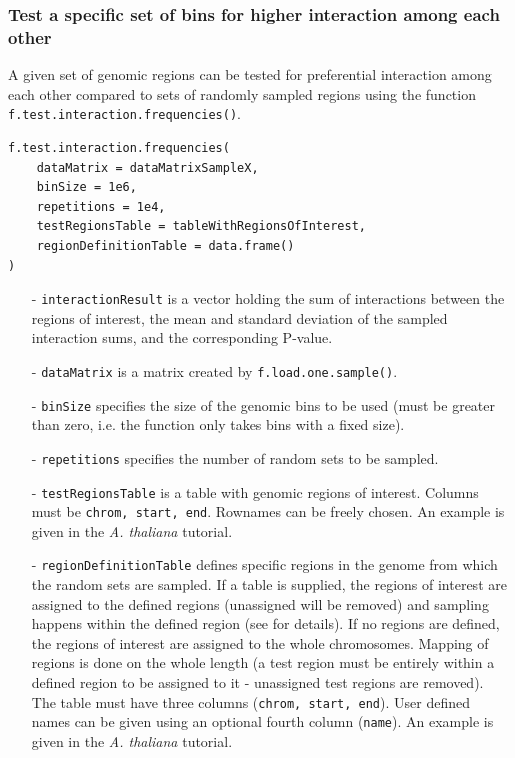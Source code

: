 \documentclass[a4paper,10pt]{article}
\begin{document}
\subsubsection{Test a specific set of bins for higher interaction among each other}
A given set of genomic regions can be tested for preferential interaction among each other compared to sets of randomly sampled regions using the function \texttt{f.test.interaction.frequencies()}.
\begin{verbatim}
f.test.interaction.frequencies(
    dataMatrix = dataMatrixSampleX,
    binSize = 1e6,
    repetitions = 1e4,
    testRegionsTable = tableWithRegionsOfInterest,
    regionDefinitionTable = data.frame()
)
\end{verbatim}
\begin{itemize}
 \item[-] \texttt{interactionResult} is a vector holding the sum of interactions between the regions of interest, the mean and standard deviation of the sampled interaction sums, and the corresponding P-value.
 \item[-] \texttt{dataMatrix} is a matrix created by \texttt{f.load.one.sample()}.
 \item[-] \texttt{binSize} specifies the size of the genomic bins to be used (must be greater than zero, i.e. the function only takes bins with a fixed size).
 \item[-] \texttt{repetitions} specifies the number of random sets to be sampled.
 \item[-] \texttt{testRegionsTable} is a table with genomic regions of interest. Columns must be \texttt{chrom, start, end}. Rownames can be freely chosen. An example is given in the \textit{A. thaliana} tutorial.
 \item[-] \texttt{regionDefinitionTable} defines specific regions in the genome from which the random sets are sampled. If a table is supplied, the regions of interest are assigned to the defined regions (unassigned will be removed) and sampling happens within the defined region (see \cite{2014_Grob} for details). If no regions are defined, the regions of interest are assigned to the whole chromosomes. Mapping of regions is done on the whole length (a test region must be entirely within a defined region to be assigned to it - unassigned test regions are removed). The table must have three columns (\texttt{chrom, start, end}). User defined names can be given using an optional fourth column (\texttt{name}). An example is given in the \textit{A. thaliana} tutorial.
\end{itemize}
\clearpage
\end{document}
